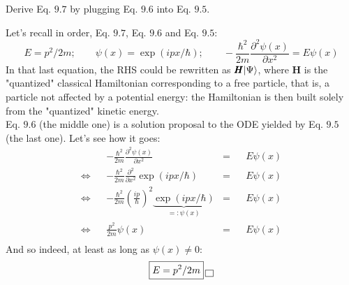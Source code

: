 \documentclass[solutions.tex]{subfiles}
\begin{document}
\maketitle
\begin{exercise} Derive Eq. $9.7$ by plugging Eq. $9.6$ into
Eq. $9.5$.
\end{exercise}
Let's recall in order,  Eq. $9.7$, Eq. $9.6$ and Eq. $9.5$:
\[
	E = p^2/2m;\qquad
	\psi(x) = \exp{(ipx/\hbar)};\qquad
	-\frac{\hbar^2}{2m}\frac{\partial^2\psi(x)}{\partial x^2} = E\psi(x)
\]
In that last equation, the RHS could be rewritten as $\bm{H}\ket{\Psi}$,
where $\bm{H}$ is the "quantized" classical Hamiltonian corresponding
to a free particle, that is, a particle not affected by a potential energy:
the Hamiltonian is then built solely from the "quantized" kinetic energy. \\

Eq. $9.6$ (the middle one) is a solution proposal to the ODE yielded by
Eq. $9.5$ (the last one). Let's see how it goes:
\begin{equation*}\begin{aligned}
	~ &&
		-\frac{\hbar^2}{2m}\frac{\partial^2\psi(x)}{\partial x^2}
		&=&& E\psi(x) \\
	\Leftrightarrow &&
		-\frac{\hbar^2}{2m}\frac{\partial^2}{\partial x^2}\exp{(ipx/\hbar)}
		&=&& E\psi(x) \\
	\Leftrightarrow &&
		-\frac{\hbar^2}{2m}\left(\frac{ip}{\hbar}\right)^2\underbrace{
			\exp{(ipx/\hbar)}
		}_{=:\psi(x)}
		&=&& E\psi(x) \\
	\Leftrightarrow &&
		\frac{p^2}{2m}\psi(x) &=&& E\psi(x) \\
\end{aligned}\end{equation*}
And so indeed, at least as long as $\psi(x)\neq0$:
\[
	\boxed{E = p^2/2m} \qed
\]
\end{document}
